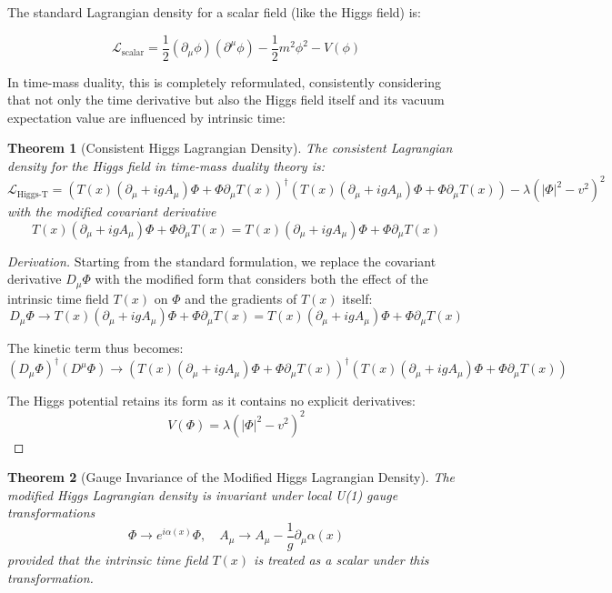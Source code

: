 \documentclass{article}
\newtheorem{theorem}{Theorem}[section]
\theoremstyle{definition}
\theoremstyle{remark}
\newcommand{\HiggsLagr}{\mathcal{L}_{\text{Higgs-T}}}
\newcommand{\Tfield}{T(x)} %
\newcommand{\DhiggsTdef}{\Tfield (\partial_\mu + igA_\mu)\Phi + \Phi \partial_\mu \Tfield}
\begin{document}
	The standard Lagrangian density for a scalar field (like the Higgs field) is:
	
	\begin{equation}
		\mathcal{L}_{\text{scalar}} = \frac{1}{2}(\partial_\mu \phi)(\partial^\mu \phi) - \frac{1}{2}m^2\phi^2 - V(\phi)
	\end{equation}
	
	In time-mass duality, this is completely reformulated, consistently considering that not only the time derivative but also the Higgs field itself and its vacuum expectation value are influenced by intrinsic time:
	
	\begin{theorem}[Consistent Higgs Lagrangian Density]
		The consistent Lagrangian density for the Higgs field in time-mass duality theory is:
		\begin{equation}
			\HiggsLagr = (\DhiggsTdef)^\dagger (\DhiggsTdef) - \lambda(|\Phi|^2 - v^2)^2
		\end{equation}
		with the modified covariant derivative
		\begin{equation}
			\DhiggsTdef = \Tfield (\partial_\mu + igA_\mu)\Phi + \Phi \partial_\mu \Tfield
		\end{equation}
	\end{theorem}
	
	\begin{proof}[Derivation]
		Starting from the standard formulation, we replace the covariant derivative $D_\mu \Phi$ with the modified form that considers both the effect of the intrinsic time field $\Tfield$ on $\Phi$ and the gradients of $\Tfield$ itself:
		\begin{equation}
			D_\mu \Phi \rightarrow \DhiggsTdef = \Tfield (\partial_\mu + igA_\mu)\Phi + \Phi \partial_\mu \Tfield
		\end{equation}
		
		The kinetic term thus becomes:
		\begin{equation}
			(D_\mu \Phi)^\dagger (D^\mu \Phi) \rightarrow (\DhiggsTdef)^\dagger (\DhiggsTdef)
		\end{equation}
		
		The Higgs potential retains its form as it contains no explicit derivatives:
		\begin{equation}
			V(\Phi) = \lambda(|\Phi|^2 - v^2)^2
		\end{equation}
	\end{proof}
	
	\begin{theorem}[Gauge Invariance of the Modified Higgs Lagrangian Density]
		The modified Higgs Lagrangian density is invariant under local U(1) gauge transformations
		\begin{equation}
			\Phi \rightarrow e^{i\alpha(x)}\Phi, \quad A_\mu \rightarrow A_\mu - \frac{1}{g}\partial_\mu \alpha(x)
		\end{equation}
		provided that the intrinsic time field $\Tfield$ is treated as a scalar under this transformation.
	\end{theorem}
	
\end{document}
